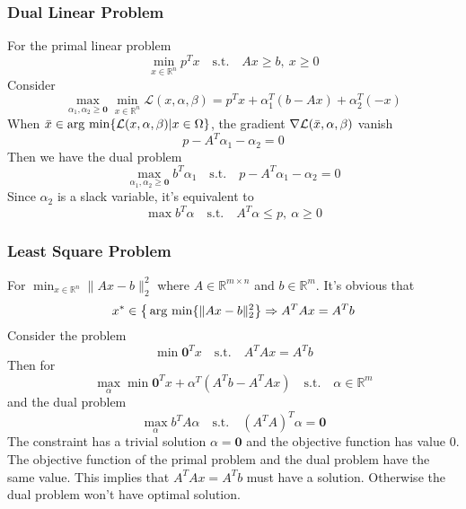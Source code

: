 \documentclass[../main.tex]{subfiles}
\begin{document}
            \subsubsection{Dual Linear Problem}
                For the primal linear problem
                \[
                    \min_{x\in\mathbb{R}^n}p^Tx\mathrm{\quad s.t.\quad}Ax\geq b,~x\geq 0
                \]
                Consider
                \[
                    \max_{\alpha_1,\alpha_2\geq \mathbf{0}}\min_{x\in\mathbb{R}^n}\mathcal{L}(x,\alpha,\beta)=p^Tx+\alpha_1^T(b-Ax)+\alpha_2^T(-x)
                \]
                When $\Bar{x}\in\mathrm{arg~min}\{\mathcal{L}(x,\alpha,\beta)|x\in\Omega\}$, the gradient $\nabla\mathcal{L}(\Bar{x},\alpha,\beta)$ vanish
                \[
                    p-A^T\alpha_1-\alpha_2=0
                \]
                Then we have the dual problem
                \[
                    \max_{\alpha_1,\alpha_2\geq \mathbf{0}}b^T\alpha_1\mathrm{\quad s.t. \quad}p-A^T\alpha_1-\alpha_2=0
                \]
                Since $\alpha_2$ is a slack variable, it's equivalent to
                \[
                    \max b^T\alpha\mathrm{\quad s.t. \quad}A^T\alpha\leq p,~\alpha\geq 0
                \]
            \subsubsection{Least Square Problem}
                For $\min_{x\in\mathbb{R}^n}\|Ax-b\|_2^2$ where $A\in\mathbb{R}^{m\times n}$ and $b\in\mathbb{R}^m$. It's obvious that
                \[
                    x^*\in\big\{ \operatorname*{arg~min}\{\|Ax-b\|_2^2 \big\}\Rightarrow A^TAx = A^Tb
                \]
                Consider the problem
                \[
                    \min \mathbf{0}^Tx\mathrm{\quad s.t. \quad}A^TAx=A^Tb
                \]
                Then for
                \[
                    \max_{\alpha}\min \mathbf{0}^Tx+\alpha^T(A^Tb-A^TAx)\mathrm{\quad s.t. \quad}\alpha\in\mathbb{R}^m
                \]
                and the dual problem
                \[
                    \max_{\alpha} b^T A \alpha \mathrm{\quad s.t. \quad} (A^TA)^T\alpha=\mathbf{0}
                \]
                The constraint has a trivial solution $\alpha=\mathbf{0}$ and the objective function has value $0$. The objective function of the primal problem and the dual problem have the same value. This implies that $A^TAx=A^Tb$ must have a solution. Otherwise the dual problem won't have optimal solution.
\end{document}
